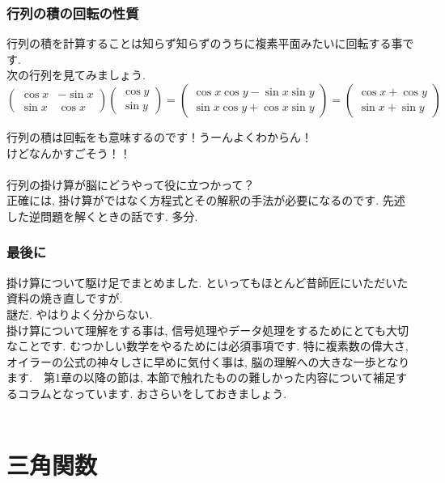 \documentclass[11pt,a4paper]{jreport}
\begin{document}
\subsection{行列の積の回転の性質}
行列の積を計算することは知らず知らずのうちに複素平面みたいに回転する事です. \\
次の行列を見てみましょう.\\
\[
  \left(	
  \begin{array}{cc}
  \cos x & -\sin x \\
  \sin x & \cos x
  \end{array}
  \right)
  \left(
  \begin{array}{c}
  \cos y \\
  \sin y
  \end{array}
  \right)
  =
  \left(
  \begin{array}{l}
  \cos x\cos y - \sin x\sin y\\
  \sin x\cos y + \cos x\sin y
  \end{array}
  \right)
  =
  \left(
  \begin{array}{c}
  \cos x + \cos y\\
  \sin x + \sin y
  \end{array}
  \right)
\]

行列の積は回転をも意味するのです！うーんよくわからん！\\
けどなんかすごそう！！\\
\\
行列の掛け算が脳にどうやって役に立つかって？\\
正確には, 掛け算がではなく方程式とその解釈の手法が必要になるのです. 先述した逆問題を解くときの話です. 多分. 
\\
\subsection{最後に}
掛け算について駆け足でまとめました. といってもほとんど昔師匠にいただいた資料の焼き直しですが. \\
謎だ. やはりよく分からない.\\
掛け算について理解をする事は, 信号処理やデータ処理をするためにとても大切なことです. むつかしい数学をやるためには必須事項です. 特に複素数の偉大さ, オイラーの公式の神々しさに早めに気付く事は, 脳の理解への大きな一歩となります.　第1章の以降の節は, 本節で触れたものの難しかった内容について補足するコラムとなっています. おさらいをしておきましょう. \\
\\

\chapter{三角関数 \label{trigonometry}}
\end{document}
